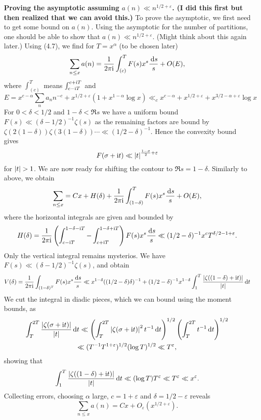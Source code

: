 \documentclass[a4paper,11pt]{article}
\begin{document}
\textbf{Proving the asymptotic assuming $a(n) \ll n^{1/2+\varepsilon}$. (I did
this first but then realized that we can avoid this.)} To prove
    the asymptotic, we first need to get some bound on $a(n)$. Using 
the asymptotic for the number of partitions, one should be able to show that 
$a(n) \ll n^{1/2+\varepsilon}$. (Might think about this again later.) 
Using (4.7), we find for $T = x^\alpha$ (to be chosen later) 
\[
    \sum_{n \leq x} a(n) = \frac{1}{2 \pi \mathrm i} \int_{(c)}^T F(s) x^s \frac{\mathrm{\,d} s}s 
    + O(E),
\]
where $\int_{(c)}^T$ means $\int_{c-\mathrm i T}^{c+\mathrm i T}$ and 
\[
    E = x^{c-\alpha} \sum_n a_n n^{-c} + x^{1/2+\varepsilon}(1+ x^{1-\alpha}\log x)
    \ll_{c} x^{c-\alpha} + x^{1/2+\varepsilon} + x^{3/2 - \alpha + \varepsilon} \log x
\]
For $0< \delta < 1/2$ and $1-\delta < \Re s$ we have a uniform bound $F(s) \ll
(\delta-1/2)^{-1} \zeta(s)$ as the remaining factors are bound by $\zeta(2(1-\delta))
\zeta(3(1-\delta)) \cdots \ll (1/2-\delta)^{-1}$. Hence the convexity bound gives
$$F(\sigma + \mathrm i t) \ll \left\lvert t \right\rvert^{\frac {1-\sigma}2 + \varepsilon}$$
for $\left\lvert t \right\rvert > 1$.
We are now ready for shifting the contour to $\Re s = 1-\delta$. Similarly to above,
we obtain
$$\sum_{n \leq x} = Cx + H(\delta) + \frac{1}{2 \pi \mathrm i} \int_{(1-\delta)}^T F(s) x^s
\frac{\mathrm{\,d} s}s + O(E),$$
where the horizontal integrals are given and bounded by 
\[
    H(\delta) = \frac{1}{2 \pi \mathrm i} \left( \int_{c-\mathrm i T}^{1-\delta - \mathrm i T} - \int_{c+\mathrm i
    T}^{1-\delta + \mathrm i T} \right) F(s) x^s \frac{\mathrm{\,d} s }s \ll (1/2-\delta)^{-1}
    x^c T^{\delta/2-1 + \varepsilon}.
\]
Only the vertical integral remains mysterios. We have $F(s) \ll (\delta-1/2)^{-1} \zeta(s)$, and obtain
\[
    V(\delta) = \frac{1}{2 \pi \mathrm i} \int_{(1-\delta)^T} F(s) x^s \frac{\mathrm{\,d} s }s 
\ll x^{1-\delta}((1/2-\delta)\delta)^{-1} + (1/2-\delta)^{-1}x^{1-\delta}\int_1^T \frac{\left\lvert \zeta((1-\delta) + \mathrm i t) \right\rvert}{\left\lvert t \right\rvert} \mathrm{\,d} t
\]
We cut the integral in diadic pieces, which we can bound using 
the moment bounds, as
\begin{multline*}
    \int_T^{2T} \frac{\left\lvert \zeta(\sigma + \mathrm i t) \right\rvert}{\left\lvert t \right\rvert} \mathrm{\,d} t
    \ll \left(\int_T^{2T}\left\lvert \zeta(\sigma+\mathrm i t) \right\rvert^2 t^{-1} \mathrm{\,d} t \right)^{1/2}
    \left( \int_T^{2T} t^{-1} \mathrm{\,d} t\right)^{1/2} \\
    \ll (T^{-1} T^{1+\varepsilon})^{1/2} (\log T)^{1/2} \ll
    T^\varepsilon,
\end{multline*}
showing that 
\[
    \int_1^T \frac{\left\lvert \zeta((1-\delta) + \mathrm i t) \right\rvert}{\left\lvert t \right\rvert} \mathrm{\,d} t
    \ll (\log T) T^\varepsilon \ll T^\varepsilon \ll x^\varepsilon.
\]
Collecting errors, choosing $\alpha$ large, $c = 1+\varepsilon$ and $\delta =
1/2-\varepsilon$ reveals
\[
    \sum_{n \leq x} a(n) = Cx + O_{\varepsilon}(x^{1/2+\varepsilon}).
\]

\contactend
\end{document}
